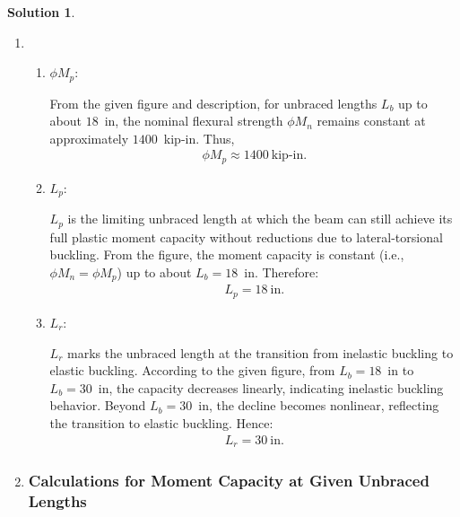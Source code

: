 \documentclass[12pt]{article}
\theoremstyle{definition} %
\newtheorem{solution}{Solution}
\theoremstyle{plain} %
\begin{document}
\begin{solution}
    \noindent
    \begin{enumerate}
        \item 
        \begin{enumerate}
                \item $\phi M_p$:
            
                From the given figure and description, for unbraced lengths $L_b$ up to about $18$~in, the nominal flexural strength $\phi M_n$ remains constant at approximately $1400$~kip-in. Thus, 
                \begin{align}
                \phi M_p \approx 1400~\text{kip-in}.
                \end{align}
            
                \item $L_p$:
            
                $L_p$ is the limiting unbraced length at which the beam can still achieve its full plastic moment capacity without reductions due to lateral-torsional buckling. From the figure, the moment capacity is constant (i.e., $\phi M_n = \phi M_p$) up to about $L_b = 18$~in. Therefore:
                \begin{align}
                L_p = 18~\text{in}.
                \end{align}
            
                \item $L_r$:
            
                $L_r$ marks the unbraced length at the transition from inelastic buckling to elastic buckling. According to the given figure, from $L_b = 18$~in to $L_b = 30$~in, the capacity decreases linearly, indicating inelastic buckling behavior. Beyond $L_b = 30$~in, the decline becomes nonlinear, reflecting the transition to elastic buckling. Hence:
                \begin{align}
                L_r = 30~\text{in}.
                \end{align}
            
            
     
        \end{enumerate}
        \hrulefill

\item \subsubsection*{Calculations for Moment Capacity at Given Unbraced Lengths}


\end{enumerate}
\end{solution}
\end{document}
